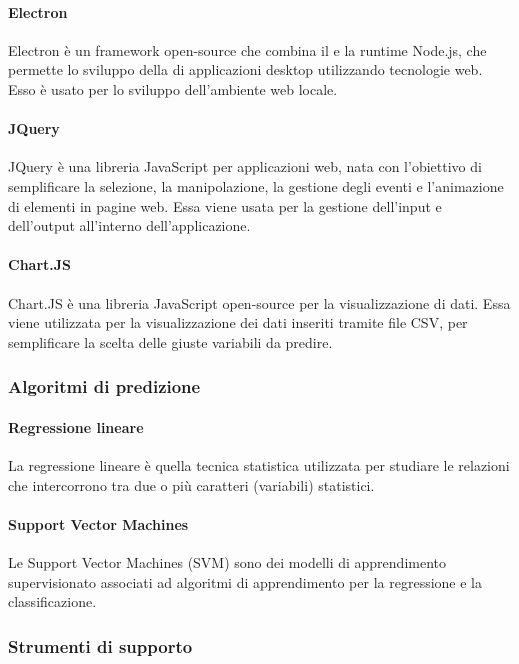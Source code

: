 \documentclass[../manuale-sviluppatore.tex]{subfiles}
\begin{document}
\paragraph{Electron}
Electron è un framework open-source che combina il   e la runtime Node.js, che permette lo sviluppo della  di applicazioni desktop utilizzando tecnologie web. Esso è usato per lo sviluppo dell'ambiente web locale.

\paragraph{JQuery}
JQuery è una libreria JavaScript per applicazioni web, nata con l'obiettivo di semplificare la selezione, la manipolazione, la gestione degli eventi e l'animazione di elementi  in pagine web. Essa viene usata per la gestione dell'input e dell'output all'interno dell'applicazione.

\paragraph{Chart.JS}
Chart.JS è una libreria JavaScript open-source per la visualizzazione di dati. Essa viene utilizzata per la visualizzazione dei dati inseriti tramite file CSV, per semplificare la scelta delle giuste variabili da predire.

\subsubsection{Algoritmi di predizione}
\paragraph{Regressione lineare}
La regressione lineare è quella tecnica statistica utilizzata per studiare le relazioni che intercorrono tra due o più caratteri (variabili) statistici.

\paragraph{Support Vector Machines}
Le Support Vector Machines (SVM) sono dei modelli di apprendimento supervisionato associati ad algoritmi di apprendimento per la regressione e la classificazione.

\subsubsection{Strumenti di supporto}
\end{document}
